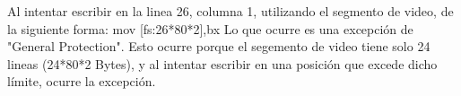 Al intentar escribir en la linea 26, columna 1, utilizando el segmento de video, de la siguiente forma:
mov [fs:26*80*2],bx
Lo que ocurre es una excepción de "General Protection". Esto ocurre porque el segemento de video tiene solo 24 lineas (24*80*2 Bytes), y al intentar escribir en una posición que excede dicho límite,  ocurre la excepción.

